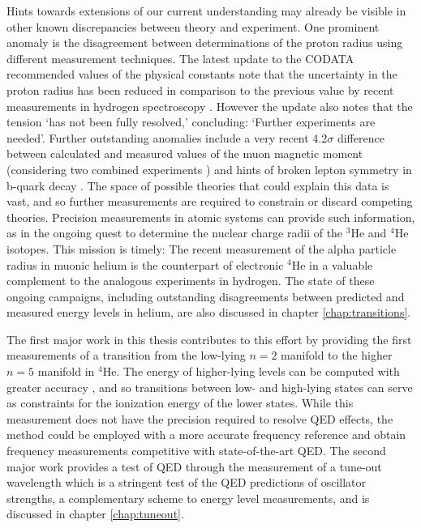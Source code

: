 	Hints towards extensions of our current understanding may already be visible in other known discrepancies between theory and experiment.
	One prominent anomaly is the disagreement between determinations of the proton radius using different measurement techniques.
	The latest update to the CODATA recommended values of the physical constants \cite{CODATA21} note that the uncertainty in the proton radius has been reduced in comparison to the previous value by recent measurements in hydrogen spectroscopy \cite{Beyer17,Bezginov19}.
	However the update also notes that the tension `has not been fully resolved,' concluding:  `Further experiments are needed'.
	Further outstanding anomalies include a very recent 4.2$\sigma$ difference between calculated and measured values of the muon magnetic moment  (considering two combined experiments \cite{Abi21}) and hints of broken lepton symmetry in b-quark decay \cite{LHCb21}.
	The space of possible theories that could explain this data is vast, and so further measurements are required to constrain or discard competing theories.
	Precision measurements in atomic systems can provide such information, as in the ongoing quest to determine the nuclear charge radii of the $^3$He and $^4$He isotopes.
	This mission is timely:  The recent measurement of the alpha particle radius in muonic helium \cite{Krauth21} is the counterpart of electronic $^4$He in a valuable complement to the analogous experiments in hydrogen.
	The state of these ongoing campaigns, including outstanding disagreements between predicted and measured energy levels in helium, are also discussed in chapter \ref{chap:transitions}.
	
	The first major work in this thesis contributes to this effort by providing the first measurements of a transition from the low-lying $n=2$ manifold to the higher $n=5$ manifold in $^4$He.
	The energy of higher-lying levels can be computed with greater accuracy \cite{Drake07}, and so transitions between low- and high-lying states can serve as constraints for the ionization energy of the lower states. While this measurement does not have the precision required to resolve QED effects, the method could be employed with a more accurate frequency reference and obtain frequency measurements competitive with state-of-the-art QED.
	The second major work provides a test of QED through the measurement of a tune-out wavelength which is a stringent test of the QED predictions of oscillator strengths, a complementary scheme to energy level measurements, and is discussed in chapter \ref{chap:tuneout}.
	
